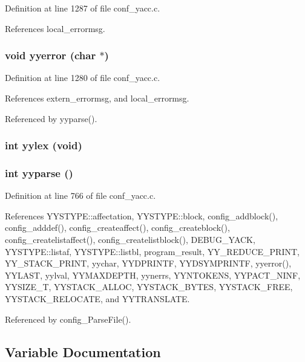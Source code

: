 Definition at line 1287 of file conf\_\-yacc.c.

References local\_\-errormsg.
\subsubsection{\setlength{\rightskip}{0pt plus 5cm}void yyerror (char $\ast$)}\label{conf__yacc_8c_a85}




Definition at line 1280 of file conf\_\-yacc.c.

References extern\_\-errormsg, and local\_\-errormsg.

Referenced by yyparse().
\subsubsection{\setlength{\rightskip}{0pt plus 5cm}int yylex (void)}\label{conf__yacc_8c_a84}


\subsubsection{\setlength{\rightskip}{0pt plus 5cm}int yyparse ()}\label{conf__yacc_8c_a87}




Definition at line 766 of file conf\_\-yacc.c.

References YYSTYPE::affectation, YYSTYPE::block, config\_\-addblock(), config\_\-adddef(), config\_\-createaffect(), config\_\-createblock(), config\_\-createlistaffect(), config\_\-createlistblock(), DEBUG\_\-YACK, YYSTYPE::listaf, YYSTYPE::listbl, program\_\-result, YY\_\-REDUCE\_\-PRINT, YY\_\-STACK\_\-PRINT, yychar, YYDPRINTF, YYDSYMPRINTF, yyerror(), YYLAST, yylval, YYMAXDEPTH, yynerrs, YYNTOKENS, YYPACT\_\-NINF, YYSIZE\_\-T, YYSTACK\_\-ALLOC, YYSTACK\_\-BYTES, YYSTACK\_\-FREE, YYSTACK\_\-RELOCATE, and YYTRANSLATE.

Referenced by config\_\-Parse\-File().

\subsection{Variable Documentation}
